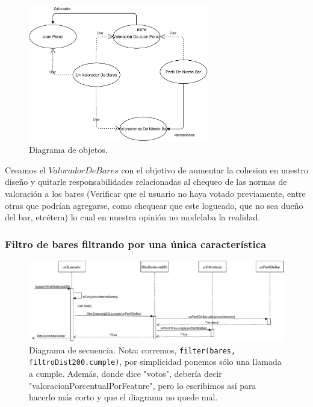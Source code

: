 \begin{figure}[H]
  \centering
  \includegraphics[width=0.7\textwidth]{diagramas/objetos_1.pdf}
  \caption{\normalfont Diagrama de objetos.}
\end{figure}

Creamos el $Valorador De Bares$ con el objetivo de aumentar la cohesion en nuestro diseño y quitarle responsabilidades relacionadas al chequeo de las normas de valoración a los bares (Verificar que el usuario no haya votado previamente, entre otras que podrían agregarse, como chequear que este logueado, que no sea dueño del bar, etcétera) lo cual en nuestra opinión no modelaba la realidad.

\subsubsection{Filtro de bares filtrando por una única característica}


\begin{figure}[H]
  \centering
  \includegraphics[width=\textwidth]{diagramas/secuencia_2.pdf}
  \caption{\normalfont Diagrama de secuencia. Nota: corremos, \texttt{filter(bares, filtroDist200.cumple)}, por simplicidad ponemos sólo una llamada a cumple.
Además, donde dice "votos", debería decir "valoracionPorcentualPorFeature", pero lo escribimos así para hacerlo más corto y que el diagrama no quede mal.
	}
\end{figure}

